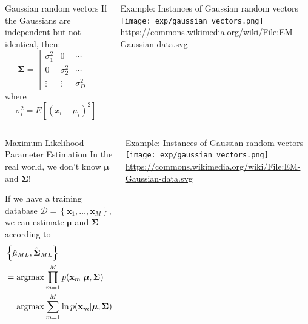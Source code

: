 \documentclass{beamer}
\newcommand{\argmax}{\operatornamewithlimits{argmax}}
\begin{document}
\begin{frame}
  \begin{columns}
    \column{2.25in}
    \begin{block}{Gaussian random vectors}
      If the Gaussians are independent but not identical, then:
      \[
      \bm{\Sigma}= \left[\begin{array}{ccc}
          \sigma_1^2 & 0 & \cdots\\
          0 & \sigma_2^2 &  \cdots\\
          \vdots & \vdots &  \sigma_{D}^2\end{array}\right]
      \]
      where
      \[
      \sigma_{i}^2=E[(x_i-\mu_i)^2]
      \]
    \end{block}
    \column{2in}
    \begin{block}{Example: Instances of Gaussian random vectors}
      \texttt{[image: exp/gaussian\_vectors.png]}
      {\footnotesize\url{https://commons.wikimedia.org/wiki/File:EM-Gaussian-data.svg}}
    \end{block}
  \end{columns}
\end{frame}

\begin{frame}
  \begin{columns}
    \column{2.25in}
    \begin{block}{Maximum Likelihood Parameter Estimation}
      In the real world, we don't know $\bm{\mu}$ and $\bm{\Sigma}$!

      If we have a training database ${\mathcal
        D}=\left\{\mathbf{x}_1,\ldots,\mathbf{x}_{M}\right\}$, we can
      estimate $\bm{\mu}$ and $\bm{\Sigma}$ according to
      \begin{align*}
        &\left\{\hat\mu_{ML},\hat{\bm{\Sigma}}_{ML}\right\} \\
        &= \argmax
        \prod_{m=1}^{M} p(\mathbf{x}_m|\bm{\mu},\bm{\Sigma})\\
        &= \argmax
        \sum_{m=1}^{M} \ln p(\mathbf{x}_m|\bm{\mu},\bm{\Sigma})
      \end{align*}
    \end{block}
    \column{2in}
    \begin{block}{Example: Instances of Gaussian random vectors}
      \texttt{[image: exp/gaussian\_vectors.png]}
      {\footnotesize\url{https://commons.wikimedia.org/wiki/File:EM-Gaussian-data.svg}}
    \end{block}
  \end{columns}
\end{frame}
\end{document}
